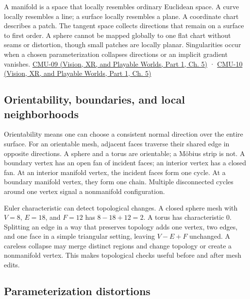 A manifold is a space that locally resembles ordinary Euclidean space. A curve locally resembles a line; a surface locally resembles a plane. A coordinate chart describes a patch. The tangent space collects directions that remain on a surface to first order. A sphere cannot be mapped globally to one flat chart without seams or distortion, though small patches are locally planar. Singularities occur when a chosen parameterization collapses directions or an implicit gradient vanishes. \href{../07-Vision-XR-and-Playable-Worlds-P01/main.pdf\#nameddest=04-visual-computing-ii-ch036-cmu-09---introduction-to-geometry}{CMU-09 (Vision, XR, and Playable Worlds, Part 1, Ch. 5)} · \href{../07-Vision-XR-and-Playable-Worlds-P01/main.pdf\#nameddest=04-visual-computing-ii-ch036-cmu-10---meshes-and-manifolds}{CMU-10 (Vision, XR, and Playable Worlds, Part 1, Ch. 5)}

\subsection{Orientability, boundaries, and local neighborhoods}\label{03-visual-computing-i-ch002-orientability-boundaries-and-local-neighborhoods}

\hypertarget{03-visual-computing-i-ch002-orientability-boundaries-and-local-neighborhoods}{}

Orientability means one can choose a consistent normal direction over the entire surface. For an orientable mesh, adjacent faces traverse their shared edge in opposite directions. A sphere and a torus are orientable; a Möbius strip is not. A boundary vertex has an open fan of incident faces; an interior vertex has a closed fan. At an interior manifold vertex, the incident faces form one cycle. At a boundary manifold vertex, they form one chain. Multiple disconnected cycles around one vertex signal a nonmanifold configuration.

Euler characteristic can detect topological changes. A closed sphere mesh with \(V=8\), \(E=18\), and \(F=12\) has \(8-18+12=2\). A torus has characteristic 0. Splitting an edge in a way that preserves topology adds one vertex, two edges, and one face in a simple triangular setting, leaving \(V-E+F\) unchanged. A careless collapse may merge distinct regions and change topology or create a nonmanifold vertex. This makes topological checks useful before and after mesh edits.

\subsection{Parameterization distortions}\label{03-visual-computing-i-ch002-parameterization-distortions}

